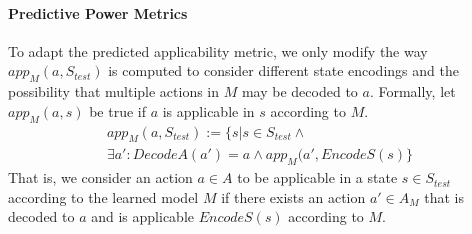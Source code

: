 \documentclass{article}
\theoremstyle{definition}
\theoremstyle{remark}
\newcommand{\stest}{\ensuremath{S_{\textit{test}}}\xspace}
\newcommand{\app}{\ensuremath{\textit{app}}\xspace}
\newcommand{\encodes}{\textit{EncodeS}\xspace}
\newcommand{\decodea}{\textit{DecodeA}\xspace}
\begin{document}
    
    





\paragraph{Predictive Power Metrics}
To adapt the predicted applicability metric, we only modify the way $\app_M(a,\stest)$ is computed to consider different state encodings and the possibility that multiple actions in $M$ may be decoded to $a$. 
Formally, let $\app_M(a,s)$ be true if $a$ is applicable in $s$ according to $M$. 
\begin{multline}
    \app_M(a,\stest):=\{s|s\in\stest  \wedge \\
        \exists a': \decodea(a')=a  
        \wedge \app_M(a',\encodes(s)\}    
\end{multline}
That is, we consider an action $a\in A$ to be applicable in a state $s\in\stest$ according to the learned model $M$ if there exists an action $a'\in A_M$ that is decoded to $a$ and is applicable $\encodes(s)$ according to $M$. 
\end{document}
